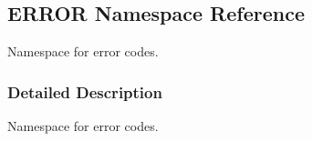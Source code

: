 \hypertarget{namespaceERROR}{}\subsection{E\+R\+R\+OR Namespace Reference}
\label{namespaceERROR}


Namespace for error codes.  




\subsubsection{Detailed Description}
Namespace for error codes. 

